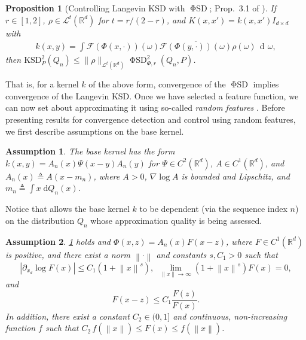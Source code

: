 \documentclass[12pt,paper=letter]{scrreprt}
\newtheorem{proposition}{Proposition}[chapter]
\newcommand{\dee}{\mathop{\mathrm{d}\!}}
\newcommand{\domega}{\,\dee \omega}
\def\defeq{\triangleq} %
\def\defined{\defeq} %
\def\norm#1{\left\|{#1}\right\|} %
\def\staticnorm#1{\|{#1}\|} %
\newcommand{\grad}{\nabla} %
\newtheorem{assumption}{Assumption}[chapter]
\newcommand{\FTop}[0]{\mathscr{F}} %
\newcommand{\feat}{\Phi} %
\newcommand{\statfeat}{F}  %
\newcommand{\statfeatscalar}{f}  %
\newcommand{\FSD}{\ensuremath{\operatorname{\mathrm{\Phi}SD}}\xspace}
\begin{document}
\begin{proposition}[Controlling Langevin KSD with \FSD; Prop.~3.1 of \citealp{huggins2018random}]\label{prop:fsd-lower-bound}
If ${r \in [1,2]}$, $\rho\in \mathcal{L}^t(\mathbb{R}^d)$ for $t = {r}{/(2-r)}$, and $K(x,x') = k(x,x') I_{d \times d}$ with
\begin{align*}
    k(x, y) = \int \FTop(\feat(x,\cdot))(\omega) \overline{\FTop(\feat(y,\cdot))(\omega)}\rho(\omega)\domega ,
\end{align*}
then $\mathrm{KSD}_P^2(Q_n)  \leq  \textstyle\staticnorm{\rho}_{\mathcal{L}^t(\mathbb{R}^d)}\FSD^{2}_{\feat,r}(Q_n,P)$.
\end{proposition}

That is, for a kernel $k$ of the above form, convergence of the \FSD implies convergence of the Langevin KSD.
Once we have selected a feature function, we can now set about approximating it using so-called \emph{random features} \citep{rahimi2007random}.
Before presenting results for convergence detection and control using random features, we first describe assumptions on the base kernel.

\begin{assumption} \label{asm:basekernel-form}
The base kernel has the form $k(x, y) = A_n(x) \Psi(x - y) A_n(y)$ 
for $\Psi \in C^2(\mathbb{R}^d)$, $A \in C^1(\mathbb{R}^d)$, and $A_n(x) \defined A(x - m_n)$,
where $A >0$, $\grad \log A$ is bounded and Lipschitz, and $m_n \defined \int x \; \mathrm{d}Q_n(x)$. 
\end{assumption}

\noindent Notice that  allows the base kernel $k$ to be dependent (via the sequence index $n$) on the distribution $Q_n$ whose approximation quality is being assessed. %


\begin{assumption} \label{asm:feature-form}
\cref{asm:basekernel-form} holds and $\Phi(x, z) = A_n(x) F(x - z)$, where
$F \in C^{1}(\mathbb{R}^d)$ is positive, and there exist a norm $\norm{\cdot}$ and constants $s, C_1 > 0$ such that 
\[
|\partial_{x_d} \log \statfeat(x)| \le C_1 (1 + \norm{x}^{s}),
~~ 
\lim_{\norm{x} \to \infty}(1 + \norm{x}^{s})\statfeat(x) = 0, 
\]
and
\[
\statfeat(x - z) \le C_1 \frac{\statfeat(z)}{\statfeat(x)}.
\]
In addition, there exist a constant $C_2 \in (0, 1]$ and continuous, non-increasing function $\statfeatscalar$ such 
that $C_2 \,\statfeatscalar(\norm{x}) \le \statfeat(x) \le \statfeatscalar(\norm{x})$. 
\end{assumption}
\end{document}
